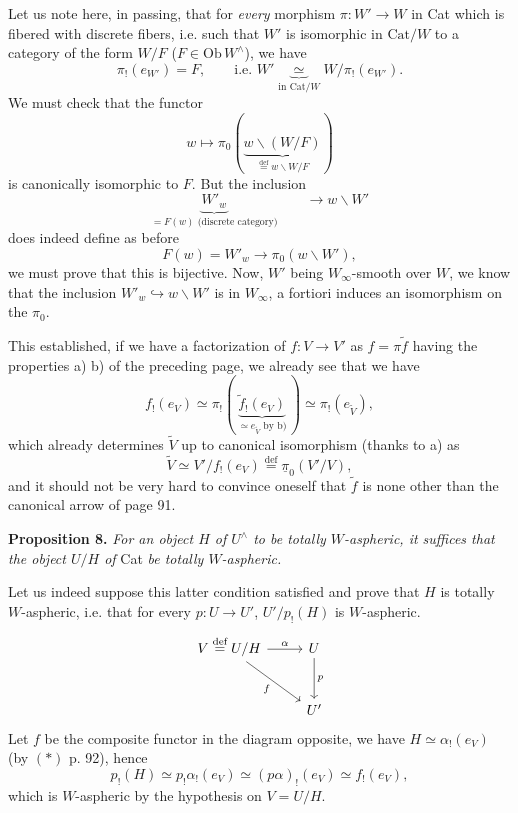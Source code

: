 \documentclass[11pt]{article}
\newcommand{\printedpage}[1]{\marginpar{\footnotesize p.~#1}}
\newcommand{\msp}[1]{\marginpar{\footnotesize [#1]}}
\newcommand{\defeq}{\overset{\text{def}}{=}}
\newcommand{\upi}{\underline{\pi}}
\newcommand{\Cat}{\mathrm{Cat}}
\newcommand{\Ob}{\mathrm{Ob}\,}
\begin{document}
Let us note here, in passing, that for \textit{every} morphism $\pi : W' \longrightarrow W$ in Cat which is fibered with discrete fibers, i.e. such that $W'$ is isomorphic in $\Cat/W$ to a category of the form $W/F$ ($F \in \Ob W^{\wedge}$), we have
\[ \pi_!(e_{W'}) = F, \qquad \text{i.e. } W' \underbrace{\ \simeq\ }_{\text{in } \Cat/W} W/\pi_!(e_{W'}). \tag*{$(*)$} \]
We must check that the functor
\[ w \longmapsto \pi_0(\underbrace{w\backslash(W/F)}_{\defeq w\backslash W/F}) \]
is canonically isomorphic to $F$. But the inclusion
\[ \underbrace{W'_w}_{= F(w) \text{ (discrete category)}} \qquad \longrightarrow w\backslash W' \]
\msp{page 93}
does indeed define as before
\[ F(w) = W'_w \longrightarrow \pi_0(w\backslash W'), \]
we must prove that this is bijective. Now, $W'$ being $W_\infty$-smooth over $W$, we know that the inclusion $W'_w \hookrightarrow w\backslash W'$ is in $W_\infty$, a fortiori induces an isomorphism on the $\pi_0$.

This established, if we have a factorization of $f : V \longrightarrow V'$ as $f = \pi\tilde{f}$ having the properties a) b) of the preceding page, we already see that we have
\[ f_!(e_V) \simeq \pi_!(\, \underbrace{\tilde{f}_!(e_V)}_{\simeq e_{\tilde{V}} \text{ by b)}} \,) \simeq \pi_!(e_{\tilde{V}}), \]
which already determines $\tilde{V}$ up to canonical isomorphism (thanks to a) as
\[ \tilde{V} \simeq V'/f_!(e_V) \defeq \upi_0(V'/V), \] %
\printedpage{66}
and it should not be very hard to convince oneself that $\tilde{f}$ is none other than the canonical arrow of page 91.

\textbf{Proposition 8.} \textit{For an object $H$ of $U^{\wedge}$ to be totally $W$-aspheric, it suffices that the object $U/H$ of} Cat \textit{be totally $W$-aspheric.}

\msp{page 94}
Let us indeed suppose this latter condition satisfied and prove that $H$ is totally $W$-aspheric, i.e. that for every $p : U \longrightarrow U'$, $U'/p_!(H)$ is $W$-aspheric.
\[
\begin{tikzcd}[row sep=large]
V \defeq U/H \arrow[r, "\alpha"] \arrow[dr, "f"'] & U \arrow[d, "p"] \\
 & U'
\end{tikzcd}
\]
Let $f$ be the composite functor in the diagram opposite, we have $H \simeq \alpha_!(e_V)$ (by $(*)$ p. 92), hence
\[ p_!(H) \simeq p_!\alpha_!(e_V) \simeq (p\alpha)_!(e_V) \simeq f_!(e_V), \]
which is $W$-aspheric by the hypothesis on $V = U/H$.
\end{document}
